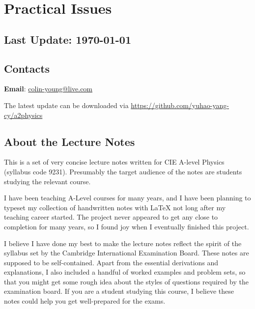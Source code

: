 \section*{Practical Issues}

\subsection*{Last Update: \today}

\subsection*{Contacts}
\textbf{Email}: \url{colin-young@live.com}

The latest update can be downloaded via \url{https://github.com/yuhao-yang-cy/a2physics}

%



\subsection*{About the Lecture Notes}

This is a set of very concise lecture notes written for CIE A-level Physics (syllabus code 9231). Presumably the target audience of the notes are students studying the relevant course.

I have been teaching A-Level courses for many years, and I have been planning to typeset my collection of handwritten notes with \LaTeX \phantom{ } not long after my teaching career started. The project never appeared to get any close to completion for many years, so I found joy when I eventually finished this project. 

I believe I have done my best to make the lecture notes reflect the spirit of the syllabus set by the Cambridge International Examination Board. These notes are supposed to be self-contained. Apart from the essential derivations and explanations, I also included a handful of worked examples and problem sets, so that you might get some rough idea about the styles of questions required by the examination board. If you are a student studying this course, I believe these notes could help you get well-prepared for the exams.

